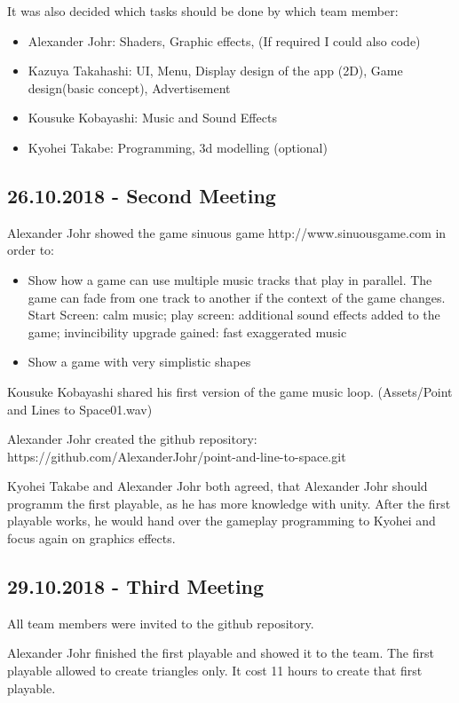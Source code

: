 It was also decided which tasks should be done by which team member:

\begin{itemize}
	\item Alexander Johr: Shaders, Graphic effects, (If required I could also code)
	\item Kazuya Takahashi: UI, Menu, Display design of the app (2D), Game design(basic concept), Advertisement
	\item Kousuke Kobayashi: Music and Sound Effects
	\item Kyohei Takabe: Programming, 3d modelling (optional)
\end{itemize}

\subsection{26.10.2018 - Second Meeting}
Alexander Johr showed the game sinuous game  http://www.sinuousgame.com in order to:
\begin{itemize}
	\item Show how a game can use multiple music tracks that play in parallel. The game can fade from one track to another if the context of the game changes. Start Screen: calm music; play screen: additional sound effects added to the game; invincibility upgrade gained: fast exaggerated music

	\item Show a game with very simplistic shapes
\end{itemize}

Kousuke Kobayashi shared his first version of the game music loop. (Assets/Point and Lines to Space01.wav)

Alexander Johr created the github repository: https://github.com/AlexanderJohr/point-and-line-to-space.git

Kyohei Takabe and Alexander Johr both agreed, that Alexander Johr should programm the first playable, as he has more knowledge with unity. After the first playable works, he would hand over the gameplay programming to Kyohei and focus again on graphics effects.

\subsection{29.10.2018 - Third Meeting}
All team members were invited to the github repository.

Alexander Johr finished the first playable and showed it to the team. The first playable allowed to create triangles only. It cost 11 hours to create that first playable.

